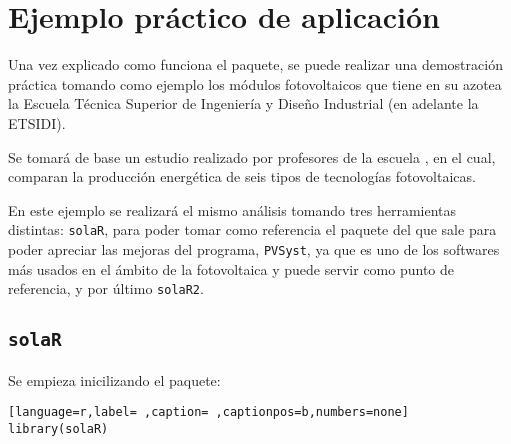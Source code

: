 \chapter{Ejemplo práctico de aplicación}
\label{chap:ejemplo-practico-aplicacion}
Una vez explicado como funciona el paquete, se puede realizar una demostración práctica tomando como ejemplo los módulos fotovoltaicos que tiene en su azotea la Escuela Técnica Superior de Ingeniería y Diseño Industrial (en adelante la ETSIDI).

Se tomará de base un estudio realizado por profesores de la escuela \cite{adrada17}, en el cual, comparan la producción energética de seis tipos de tecnologías fotovoltaicas.

En este ejemplo se realizará el mismo análisis tomando tres herramientas distintas: \texttt{solaR}, para poder tomar como referencia el paquete del que sale para poder apreciar las mejoras del programa, \texttt{PVSyst}, ya que es uno de los softwares más usados en el ámbito de la fotovoltaica y puede servir como punto de referencia, y por último \texttt{solaR2}.

\section{\texttt{solaR}}
\label{sec:org48f705f}
\label{sec:solaR}
Se empieza inicilizando el paquete:
\begin{lstlisting}[language=r,label= ,caption= ,captionpos=b,numbers=none]
library(solaR)
\end{lstlisting}

